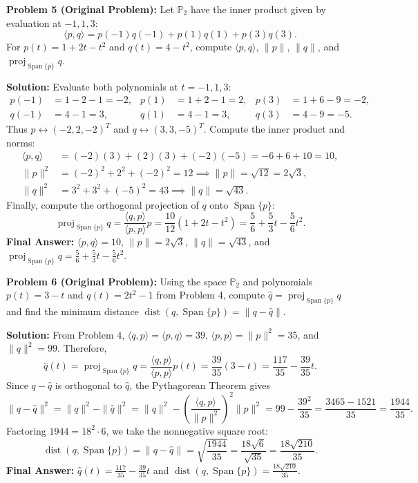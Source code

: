 \documentclass[11pt, letterpaper]{article}
\theoremstyle{definition}
\theoremstyle{remark}
\begin{document}
\medskip

\textbf{Problem 5 (Original Problem):} Let $\mathbb{P}_2$ have the inner product given by evaluation at $-1, 1, 3$:
\[
\langle p, q \rangle = p(-1)q(-1) + p(1)q(1) + p(3)q(3).
\]
For $p(t) = 1 + 2t - t^2$ and $q(t) = 4 - t^2$, compute $\langle p, q \rangle$, $\|p\|$, $\|q\|$, and $\operatorname{proj}_{\operatorname{Span}\{p\}} q$.

\textbf{Solution:} Evaluate both polynomials at $t = -1, 1, 3$:
\begin{align*}
p(-1) &= 1 - 2 - 1 = -2, & p(1) &= 1 + 2 - 1 = 2, & p(3) &= 1 + 6 - 9 = -2, \\
q(-1) &= 4 - 1 = 3, & q(1) &= 4 - 1 = 3, & q(3) &= 4 - 9 = -5.
\end{align*}
Thus $p \leftrightarrow (-2, 2, -2)^T$ and $q \leftrightarrow (3, 3, -5)^T$. Compute the inner product and norms:
\begin{align*}
\langle p, q \rangle &= (-2)(3) + (2)(3) + (-2)(-5) = -6 + 6 + 10 = 10, \\
\|p\|^2 &= (-2)^2 + 2^2 + (-2)^2 = 12 \implies \|p\| = \sqrt{12} = 2\sqrt{3}, \\
\|q\|^2 &= 3^2 + 3^2 + (-5)^2 = 43 \implies \|q\| = \sqrt{43}.
\end{align*}
Finally, compute the orthogonal projection of $q$ onto $\operatorname{Span}\{p\}$:
\[
\operatorname{proj}_{\operatorname{Span}\{p\}} q = \frac{\langle q, p \rangle}{\langle p, p \rangle}p = \frac{10}{12}(1 + 2t - t^2) = \frac{5}{6} + \frac{5}{3}t - \frac{5}{6}t^2.
\]
\textbf{Final Answer:} $\langle p, q \rangle = 10$, $\|p\| = 2\sqrt{3}$, $\|q\| = \sqrt{43}$, and $\operatorname{proj}_{\operatorname{Span}\{p\}} q = \frac{5}{6} + \frac{5}{3}t - \frac{5}{6}t^2$.

\medskip

\textbf{Problem 6 (Original Problem):} Using the space $\mathbb{P}_2$ and polynomials $p(t) = 3 - t$ and $q(t) = 2t^2 - 1$ from Problem 4, compute $\hat{q} = \operatorname{proj}_{\operatorname{Span}\{p\}} q$ and find the minimum distance $\operatorname{dist}(q, \operatorname{Span}\{p\}) = \|q - \hat{q}\|$.

\textbf{Solution:} From Problem 4, $\langle q, p \rangle = \langle p, q \rangle = 39$, $\langle p, p \rangle = \|p\|^2 = 35$, and $\|q\|^2 = 99$. Therefore,
\[
\hat{q}(t) = \operatorname{proj}_{\operatorname{Span}\{p\}} q = \frac{\langle q, p \rangle}{\langle p, p \rangle}p(t) = \frac{39}{35}(3 - t) = \frac{117}{35} - \frac{39}{35}t.
\]
Since $q - \hat{q}$ is orthogonal to $\hat{q}$, the Pythagorean Theorem gives
\[
\|q - \hat{q}\|^2 = \|q\|^2 - \|\hat{q}\|^2 = \|q\|^2 - \left(\frac{\langle q, p \rangle}{\|p\|^2}\right)^2 \|p\|^2 = 99 - \frac{39^2}{35} = \frac{3465 - 1521}{35} = \frac{1944}{35}.
\]
Factoring $1944 = 18^2 \cdot 6$, we take the nonnegative square root:
\[
\operatorname{dist}(q, \operatorname{Span}\{p\}) = \|q - \hat{q}\| = \sqrt{\frac{1944}{35}} = \frac{18\sqrt{6}}{\sqrt{35}} = \frac{18\sqrt{210}}{35}.
\]
\textbf{Final Answer:} $\hat{q}(t) = \frac{117}{35} - \frac{39}{35}t$ and $\operatorname{dist}(q, \operatorname{Span}\{p\}) = \frac{18\sqrt{210}}{35}$.
\end{document}
